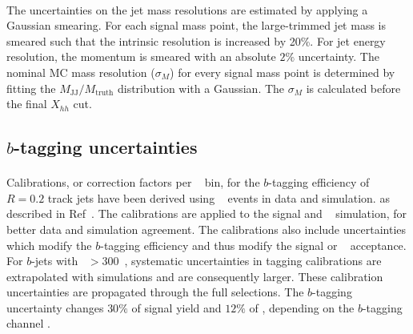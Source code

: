 \paragraph{}
The uncertainties on the jet mass resolutions are estimated by applying a Gaussian smearing.
For each signal mass point, the large-\R trimmed jet mass is smeared such that the intrinsic resolution is increased by 20\%. 
For jet energy resolution, the momentum is smeared with an absolute $2\%$ uncertainty. 
The nominal MC mass resolution ($\sigma_{M}$) for every signal mass point is determined by fitting the $M_\text{JJ} / M_\text{truth}$ distribution with a Gaussian. 
The $\sigma_{M}$ is calculated before the final $X_{hh}$ cut.


\subsection{$b$-tagging uncertainties}
\label{sec:b-tagging-unc}

\paragraph{}
Calibrations, or correction factors per \pt~ bin, for the $b$-tagging efficiency of $R=0.2$ track jets have been derived using \ttbar~ events in data and simulation. as described in Ref~\cite{Aad:2015ydr, ATL-COM-PHYS-2015-009, ATL-COM-PHYS-2015-1323}.
The calibrations are applied to the signal and \ttbar~ simulation, for better data and simulation agreement.  
The calibrations also include uncertainties which modify the $b$-tagging efficiency and thus modify the signal or \ttbar~ acceptance.
For $b$-jets with \pt~$> 300$~\GeV, systematic uncertainties in tagging calibrations are extrapolated with simulations and are consequently larger.
These calibration uncertainties are propagated through the full selections.
The $b$-tagging uncertainty changes $30\%$ of signal yield and $12\%$ of \ttbar, depending on the $b$-tagging channel .

